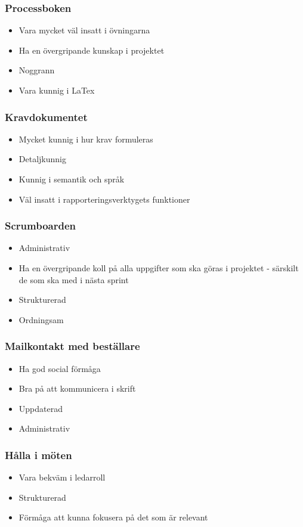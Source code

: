 \documentclass{article}
\begin{document}
\subsubsection{Processboken}
\begin{itemize}
\item Vara mycket väl insatt i övningarna
\item Ha en övergripande kunskap i projektet
\item Noggrann
\item Vara kunnig i LaTex
\end{itemize}

\subsubsection{Kravdokumentet}
\begin{itemize}
\item Mycket kunnig i hur krav formuleras
\item Detaljkunnig
\item Kunnig i semantik och språk
\item Väl insatt i rapporteringsverktygets funktioner
\end{itemize}

\subsubsection{Scrumboarden}
\begin{itemize}
\item Administrativ
\item Ha en övergripande koll på alla uppgifter som ska göras i projektet - särskilt de som ska med i nästa sprint
\item Strukturerad
\item Ordningsam
\end{itemize}

\subsubsection{Mailkontakt med beställare}
\begin{itemize}
\item Ha god social förmåga
\item Bra på att kommunicera i skrift
\item Uppdaterad
\item Administrativ
\end{itemize}

\subsubsection{Hålla i möten}
\begin{itemize}
\item Vara bekväm i ledarroll
\item Strukturerad
\item Förmåga att kunna fokusera på det som är relevant
\end{itemize}
\end{document}
